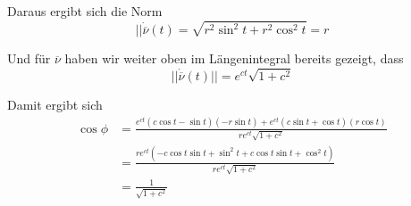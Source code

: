 \documentclass[a4paper,german,12pt,smallheadings]{scrartcl}
\begin{document}
\begin{enumerate}[(1)]
    Daraus ergibt sich die Norm
    \begin{equation*}
      ||\dot{\overline{\nu}}(t) = \sqrt{r^2 \sin^2 t + r^2 \cos^2 t} = r
    \end{equation*}

    Und für $\overline{\nu}$ haben wir weiter oben im Längenintegral bereits gezeigt, dass
    \begin{equation*}
      ||\dot{\overline{\nu}}(t)|| = e^{ct} \sqrt{1+c^2}
    \end{equation*}

    Damit ergibt sich
    \begin{align*}
      \cos \phi &= \frac{e^{ct} (c \cos t - \sin t)(-r \sin t) + e^{ct} (c \sin t + \cos t)(r \cos t)}{re^{ct}\sqrt{1+c^2}} \\
                &= \frac{re^{ct} (-c\cos t \sin t + \sin^2 t + c \cos t \sin t + \cos^2 t)}{re^{ct} \sqrt{1+c^2}} \\
                &= \frac{1}{\sqrt{1+c^2}}
    \end{align*}
\end{enumerate}
\end{document}
